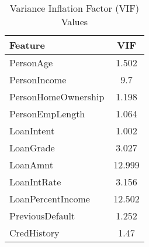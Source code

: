 \begin{table}[H]\centering
\caption{Variance Inflation Factor (VIF) Values}
\label{Table 4:vif_values}
\begin{tabular}{lc}
\toprule
Feature & VIF \\
\midrule
PersonAge & 1.502 \\
PersonIncome & 9.7 \\
PersonHomeOwnership & 1.198 \\
PersonEmpLength & 1.064 \\
LoanIntent & 1.002 \\
LoanGrade & 3.027 \\
LoanAmnt & 12.999 \\
LoanIntRate & 3.156 \\
LoanPercentIncome & 12.502 \\
PreviousDefault & 1.252 \\
CredHistory & 1.47 \\
\bottomrule
\end{tabular}
\end{table}
